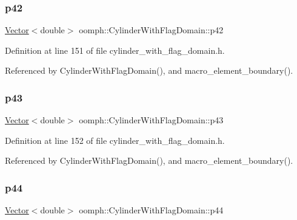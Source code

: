 \subsubsection{\texorpdfstring{p42}{p42}}
{\footnotesize\ttfamily \hyperlink{classoomph_1_1Vector}{Vector}$<$double$>$ oomph\+::\+Cylinder\+With\+Flag\+Domain\+::p42\hspace{0.3cm}{\ttfamily [private]}}



Definition at line 151 of file cylinder\+\_\+with\+\_\+flag\+\_\+domain.\+h.



Referenced by Cylinder\+With\+Flag\+Domain(), and macro\+\_\+element\+\_\+boundary().

\mbox{\label{classoomph_1_1CylinderWithFlagDomain_a4cf79435459ac5399f94f6e0686e5a0a}} 
\subsubsection{\texorpdfstring{p43}{p43}}
{\footnotesize\ttfamily \hyperlink{classoomph_1_1Vector}{Vector}$<$double$>$ oomph\+::\+Cylinder\+With\+Flag\+Domain\+::p43\hspace{0.3cm}{\ttfamily [private]}}



Definition at line 152 of file cylinder\+\_\+with\+\_\+flag\+\_\+domain.\+h.



Referenced by Cylinder\+With\+Flag\+Domain(), and macro\+\_\+element\+\_\+boundary().

\mbox{\label{classoomph_1_1CylinderWithFlagDomain_a4288652a4436b747a86ff94346c61ebc}} 
\subsubsection{\texorpdfstring{p44}{p44}}
{\footnotesize\ttfamily \hyperlink{classoomph_1_1Vector}{Vector}$<$double$>$ oomph\+::\+Cylinder\+With\+Flag\+Domain\+::p44\hspace{0.3cm}{\ttfamily [private]}}



